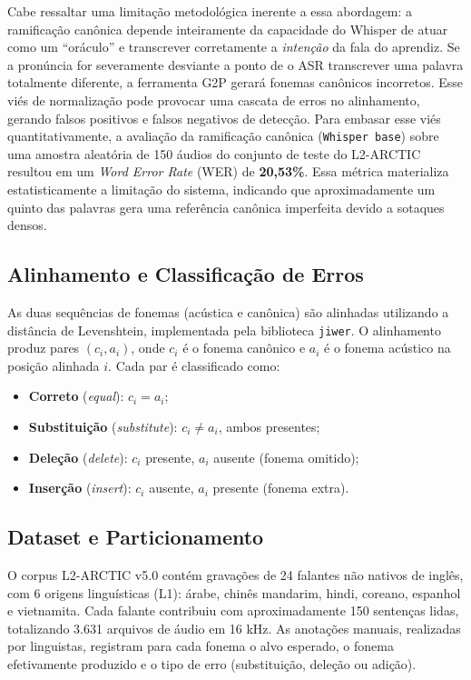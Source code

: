 \documentclass[12pt]{article}
\begin{document}
Cabe ressaltar uma limitação metodológica inerente a essa abordagem: a ramificação canônica depende inteiramente da capacidade do Whisper de atuar como um ``oráculo'' e transcrever corretamente a \textit{intenção} da fala do aprendiz. Se a pronúncia for severamente desviante a ponto de o ASR transcrever uma palavra totalmente diferente, a ferramenta G2P gerará fonemas canônicos incorretos. Esse viés de normalização pode provocar uma cascata de erros no alinhamento, gerando falsos positivos e falsos negativos de detecção. Para embasar esse viés quantitativamente, a avaliação da ramificação canônica (\texttt{Whisper base}) sobre uma amostra aleatória de 150 áudios do conjunto de teste do L2-ARCTIC resultou em um \textit{Word Error Rate} (WER) de \textbf{20,53\%}. Essa métrica materializa estatisticamente a limitação do sistema, indicando que aproximadamente um quinto das palavras gera uma referência canônica imperfeita devido a sotaques densos.

\subsection{Alinhamento e Classificação de Erros}

As duas sequências de fonemas (acústica e canônica) são alinhadas utilizando a distância de Levenshtein, implementada pela biblioteca \texttt{jiwer}. O alinhamento produz pares $(c_i, a_i)$, onde $c_i$ é o fonema canônico e $a_i$ é o fonema acústico na posição alinhada $i$. Cada par é classificado como:

\begin{itemize}
    \item \textbf{Correto} (\textit{equal}): $c_i = a_i$;
    \item \textbf{Substituição} (\textit{substitute}): $c_i \neq a_i$, ambos presentes;
    \item \textbf{Deleção} (\textit{delete}): $c_i$ presente, $a_i$ ausente (fonema omitido);
    \item \textbf{Inserção} (\textit{insert}): $c_i$ ausente, $a_i$ presente (fonema extra).
\end{itemize}

\subsection{Dataset e Particionamento}

O corpus L2-ARCTIC v5.0 \cite{zhao2018} contém gravações de 24 falantes não nativos de inglês, com 6 origens linguísticas (L1): árabe, chinês mandarim, hindi, coreano, espanhol e vietnamita. Cada falante contribuiu com aproximadamente 150 sentenças lidas, totalizando 3.631 arquivos de áudio em 16 kHz. As anotações manuais, realizadas por linguistas, registram para cada fonema o alvo esperado, o fonema efetivamente produzido e o tipo de erro (substituição, deleção ou adição).
\end{document}
